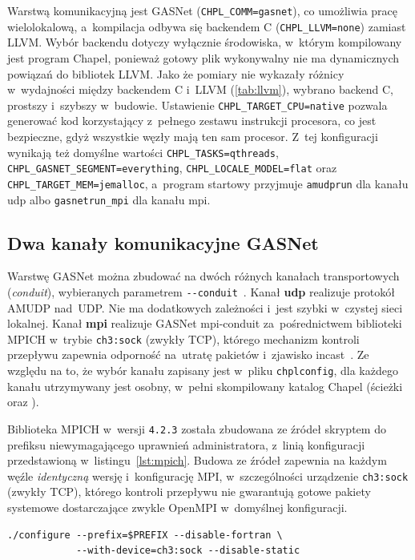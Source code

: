 Warstwą komunikacyjną jest GASNet (\texttt{CHPL\_COMM=gasnet}), co umożliwia pracę wielolokalową,
a~kompilacja odbywa się backendem C (\texttt{CHPL\_LLVM=none}) zamiast LLVM. Wybór backendu dotyczy
wyłącznie środowiska, w~którym kompilowany jest program Chapel, ponieważ gotowy plik wykonywalny
nie ma dynamicznych powiązań do bibliotek LLVM. Jako że pomiary nie wykazały różnicy w~wydajności
między backendem C i~LLVM (\cref{tab:llvm}), wybrano backend C, prostszy i~szybszy w~budowie.
Ustawienie \texttt{CHPL\_TARGET\_CPU=native} pozwala generować kod korzystający z~pełnego zestawu
instrukcji procesora, co jest bezpieczne, gdyż wszystkie węzły mają ten sam procesor.
Z~tej konfiguracji wynikają też domyślne wartości \texttt{CHPL\_TASKS=qthreads},
\texttt{CHPL\_GASNET\_SEGMENT=everything}, \texttt{CHPL\_LOCALE\_MODEL=flat} oraz
\texttt{CHPL\_TARGET\_MEM=jemalloc}, a~program startowy przyjmuje \texttt{amudprun} dla kanału udp
albo \texttt{gasnetrun\_mpi} dla kanału mpi.

\subsection{Dwa kanały komunikacyjne GASNet}

Warstwę GASNet można zbudować na dwóch różnych kanałach transportowych (\emph{conduit}), wybieranych parametrem \texttt{-{}-conduit}~\cite{gasnet-spec}. Kanał \textbf{udp} realizuje protokół AMUDP nad~UDP. Nie ma dodatkowych zależności i~jest szybki w~czystej sieci lokalnej. Kanał \textbf{mpi} realizuje GASNet mpi-conduit za~pośrednictwem biblioteki MPICH w~trybie \texttt{ch3:sock} (zwykły TCP), którego mechanizm kontroli przepływu zapewnia odporność na~utratę pakietów i~zjawisko \mbox{incast}~\cite{mpich,mpi-standard}. Ze względu na to, że wybór kanału zapisany jest w~pliku \texttt{chplconfig}, dla każdego kanału utrzymywany jest osobny, w~pełni skompilowany katalog Chapel (ścieżki  oraz ).

Biblioteka MPICH w~wersji \texttt{4.2.3} została zbudowana ze źródeł skryptem  do prefiksu niewymagającego uprawnień administratora, z~linią konfiguracji przedstawioną w~listingu~\ref{lst:mpich}. Budowa ze źródeł zapewnia na każdym węźle \emph{identyczną} wersję i~konfigurację MPI, w~szczególności urządzenie \texttt{ch3:sock} (zwykły TCP), którego kontroli przepływu nie gwarantują gotowe pakiety systemowe dostarczające zwykle OpenMPI w~domyślnej konfiguracji.

\begin{lstlisting}[style=bash, caption={Linia konfiguracji budowy MPICH ze źródeł.}, label={lst:mpich}]
./configure --prefix=$PREFIX --disable-fortran \
            --with-device=ch3:sock --disable-static
\end{lstlisting}

